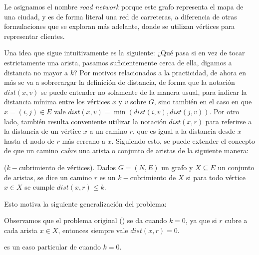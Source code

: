 
Le asignamos el nombre \emph{road network} porque este grafo representa el mapa de una ciudad, y es de forma literal una red de carreteras, a diferencia de otras formulaciones que se exploran más adelante, donde se utilizan vértices para representar clientes.

Una idea que sigue intuitivamente es la siguiente: ¿Qué pasa si en vez de tocar estrictamente una arista, pasamos suficientemente cerca de ella, digamos a distancia no mayor a $k$? Por motivos relacionados a la practicidad, de ahora en más se va a sobrecargar la definición de distancia, de forma que la notación $dist(x, v)$ se puede entender no solamente de la manera usual, para indicar la distancia mínima entre los vértices $x$ y $v$ sobre $G$, sino también en el caso en que $x = (i, j) \in E$ vale $dist(x, v) = \min(dist(i, v), dist(j, v))$. Por otro lado, también resulta conveniente utilizar la notación $dist(x, r)$ para referirse a la distancia de un vértice $x$ a un camino $r$, que es igual a la distancia desde $x$ hasta el nodo de $r$ más cercano a $x$. Siguiendo esto, se puede extender el concepto de que un camino \emph{cubre} una arista o conjunto de aristas de la siguiente manera:

\begin{definition}
($k-$cubrimiento de vértices).
Dados $G = (N, E)$ un grafo y $X \subseteq E$ un conjunto de aristas, se dice un camino $r$ es un $k-$cubrimiento de $X$ si para todo vértice $x \in X$ se cumple $dist(x, r) \leq k$. 
\end{definition}

Esto motiva la siguiente generalización del problema:


Observamos que el problema original () se da cuando $k=0$, ya que si $r$ cubre a cada arista $x \in X$, entonces siempre vale $dist(x, r) = 0$. 

\begin{observation}
 es un caso particular de  cuando $k=0$.
\end{observation}

